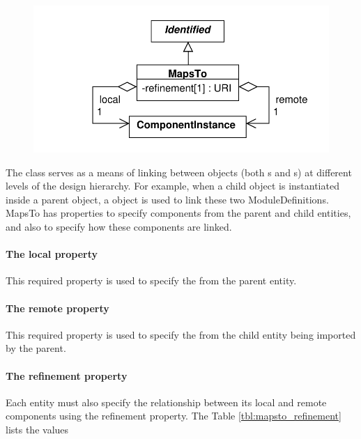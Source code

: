 \begin{figure}[ht]
\begin{center}
\includegraphics[scale=0.6]{uml/maps_to}
\caption[]{}
\label{uml:maps_to}
\end{center}
\end{figure}
The  class serves as a means of linking between  objects (both s and s) at different levels of the design hierarchy. For example, when a child  object is instantiated inside a parent  object, a  object is used to link these two ModuleDefinitions. MapsTo has properties to specify components from the parent and child entities, and also to specify how these components are linked.


\paragraph{The local property}
This required property is used to specify the  from the parent entity.

\paragraph{The remote property}
This required property is used to specify the  from the child entity being imported by the parent.

\paragraph{The refinement property}
Each  entity must also specify the relationship between its local and remote components using the refinement property. The Table \ref{tbl:mapsto_refinement} lists the values 

